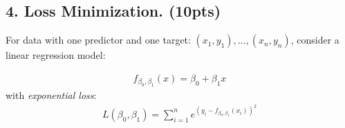 \documentclass[10pt]{article}
\begin{document}
\vspace{10em}

\newpage
\subsection{4. Loss Minimization. (\textbf{\small 10pts})}

For data with one predictor and one target: $(x_1, y_1), \ldots, (x_n, y_n)$, consider a linear regression model:

\begin{align*}
f_{\beta_0,\beta_1}(x) = \beta_0 + \beta_1 x
\end{align*}
with \emph{exponential loss}:
\begin{align*}
L(\beta_0,\beta_1) = \sum_{i=1}^n e^{(y_i - f_{\beta_0,\beta_1}(x_i))^2}
\end{align*}
\end{document}
